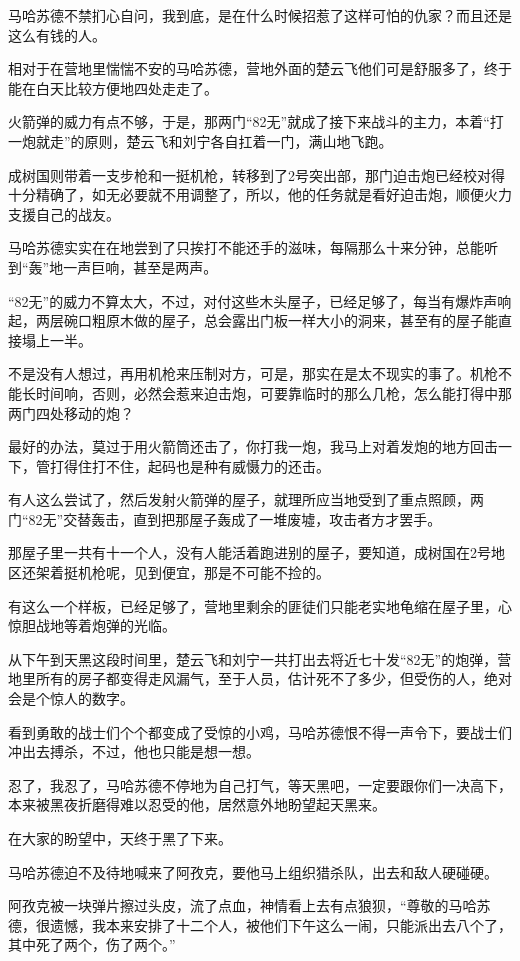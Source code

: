 马哈苏德不禁扪心自问，我到底，是在什么时候招惹了这样可怕的仇家？而且还是这么有钱的人。

相对于在营地里惴惴不安的马哈苏德，营地外面的楚云飞他们可是舒服多了，终于能在白天比较方便地四处走走了。

火箭弹的威力有点不够，于是，那两门“82无”就成了接下来战斗的主力，本着“打一炮就走”的原则，楚云飞和刘宁各自扛着一门，满山地飞跑。

成树国则带着一支步枪和一挺机枪，转移到了2号突出部，那门迫击炮已经校对得十分精确了，如无必要就不用调整了，所以，他的任务就是看好迫击炮，顺便火力支援自己的战友。

马哈苏德实实在在地尝到了只挨打不能还手的滋味，每隔那么十来分钟，总能听到“轰”地一声巨响，甚至是两声。

“82无”的威力不算太大，不过，对付这些木头屋子，已经足够了，每当有爆炸声响起，两层碗口粗原木做的屋子，总会露出门板一样大小的洞来，甚至有的屋子能直接塌上一半。

不是没有人想过，再用机枪来压制对方，可是，那实在是太不现实的事了。机枪不能长时间响，否则，必然会惹来迫击炮，可要靠临时的那么几枪，怎么能打得中那两门四处移动的炮？

最好的办法，莫过于用火箭筒还击了，你打我一炮，我马上对着发炮的地方回击一下，管打得住打不住，起码也是种有威慑力的还击。

有人这么尝试了，然后发射火箭弹的屋子，就理所应当地受到了重点照顾，两门“82无”交替轰击，直到把那屋子轰成了一堆废墟，攻击者方才罢手。

那屋子里一共有十一个人，没有人能活着跑进别的屋子，要知道，成树国在2号地区还架着挺机枪呢，见到便宜，那是不可能不捡的。

有这么一个样板，已经足够了，营地里剩余的匪徒们只能老实地龟缩在屋子里，心惊胆战地等着炮弹的光临。

从下午到天黑这段时间里，楚云飞和刘宁一共打出去将近七十发“82无”的炮弹，营地里所有的房子都变得走风漏气，至于人员，估计死不了多少，但受伤的人，绝对会是个惊人的数字。

看到勇敢的战士们个个都变成了受惊的小鸡，马哈苏德恨不得一声令下，要战士们冲出去搏杀，不过，他也只能是想一想。

忍了，我忍了，马哈苏德不停地为自己打气，等天黑吧，一定要跟你们一决高下，本来被黑夜折磨得难以忍受的他，居然意外地盼望起天黑来。

在大家的盼望中，天终于黑了下来。

马哈苏德迫不及待地喊来了阿孜克，要他马上组织猎杀队，出去和敌人硬碰硬。

阿孜克被一块弹片擦过头皮，流了点血，神情看上去有点狼狈，“尊敬的马哈苏德，很遗憾，我本来安排了十二个人，被他们下午这么一闹，只能派出去八个了，其中死了两个，伤了两个。”

